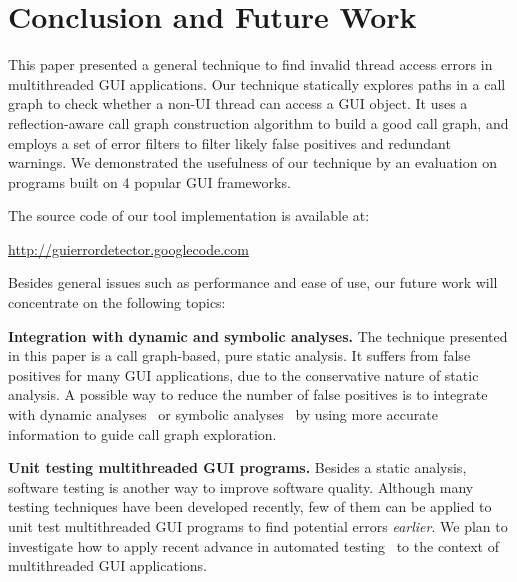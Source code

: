 \section{Conclusion and Future Work}

This paper presented a general technique to find invalid
thread access errors in multithreaded GUI applications. 
Our technique statically explores paths in a call graph to check
whether a non-UI thread can access a GUI object.
It uses a reflection-aware call graph construction algorithm
to build a good call graph, and employs a set of error
filters to filter likely false positives and redundant warnings.
We demonstrated the usefulness of our technique
by an evaluation on \subnum programs built on 4 popular GUI
frameworks. 

The source code of our tool implementation is available at:


\noindent \url{http://guierrordetector.googlecode.com}


\vspace{1mm}


Besides general issues such as performance and ease of use, our future
work will concentrate on the following topics:

\textbf{Integration with dynamic and symbolic analyses.} The technique 
presented in this paper is a call graph-based, pure static analysis. 
It suffers from false positives for many GUI applications,
due to the conservative nature of static analysis.
A possible way to reduce the number of false
positives is to integrate with
dynamic analyses~\cite{Jiang:2008:PPS:1453101.1453110}
or symbolic analyses~\cite{xie05:symstra, Pasareanu:2011, halfond09issta, BMF97}
by using more accurate information to guide call graph exploration.

\textbf{Unit testing multithreaded GUI programs.} Besides
a static analysis,  software testing is another
way to improve software quality.  Although many
testing techniques have been developed recently, few of them can be applied
to unit test multithreaded GUI programs to find potential errors \textit{earlier}. We
plan to investigate how to apply recent advance in automated
testing~\cite{Staats:2011:PTO:1985793.1985847, Jagannath:2011:IMU:2025113.2025145, Muccini_Bertolino_Inverardi_2004, Ricca:2001:ATW:381473.381476, Harman:2007}
to the context of multithreaded GUI applications.


